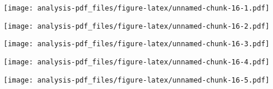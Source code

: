 \documentclass[
]{article}
\newenvironment{Shaded}{\begin{snugshade}}{\end{snugshade}}
\newcommand{\KeywordTok}[1]{\textcolor[rgb]{0.13,0.29,0.53}{\textbf{#1}}}
\newcommand{\NormalTok}[1]{#1}
\newcommand{\OperatorTok}[1]{\textcolor[rgb]{0.81,0.36,0.00}{\textbf{#1}}}
\begin{document}
\begin{Shaded}
\end{Shaded}

\texttt{[image: analysis-pdf\_files/figure-latex/unnamed-chunk-16-1.pdf]}

\begin{Shaded}
\end{Shaded}

\texttt{[image: analysis-pdf\_files/figure-latex/unnamed-chunk-16-2.pdf]}

\begin{Shaded}
\end{Shaded}

\texttt{[image: analysis-pdf\_files/figure-latex/unnamed-chunk-16-3.pdf]}

\begin{Shaded}
\end{Shaded}

\texttt{[image: analysis-pdf\_files/figure-latex/unnamed-chunk-16-4.pdf]}

\begin{Shaded}
\end{Shaded}

\texttt{[image: analysis-pdf\_files/figure-latex/unnamed-chunk-16-5.pdf]}

\begin{Shaded}
\end{Shaded}
\end{document}
